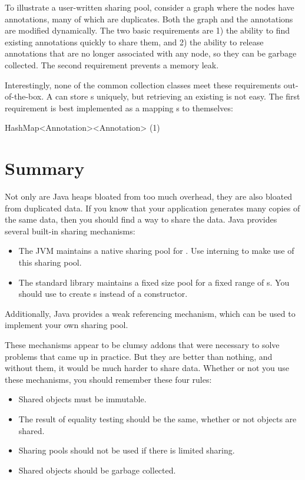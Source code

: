 To illustrate a user-written sharing pool, consider a graph where the nodes
have annotations, many of which are duplicates. Both the graph and the
annotations are modified dynamically. The two basic requirements are 1) the
ability to find existing annotations quickly to share them, and 2) the ability
to release annotations that are no longer associated with any node, so they can
be garbage collected.  The second requirement prevents a memory leak. 

Interestingly, none of the common collection classes meet these
requirements out-of-the-box. A  can store
s uniquely, but retrieving an existing  is not easy. 
The first requirement is best implemented as a  mapping
s to themselves:
\begin{shortlisting}
 	HashMap<Annotation><Annotation>   (1)
\end{shortlisting}


\section{Summary} 

Not only are Java heaps bloated from too much overhead, they
are also bloated from duplicated data. If you know that your application
generates many copies of the same data, then you should find a way to share the
data. Java provides several built-in sharing mechanisms:

\begin{itemize}
  \item The JVM maintains a native sharing
  pool for . Use  interning to make use of this
  sharing pool.
  \item The standard library maintains a fixed size pool for
   a fixed range of  s. You should use  to create
   s instead of a constructor.
\end{itemize}
Additionally, Java provides a weak referencing mechanism, which can be used to
implement your own sharing pool.

These mechanisms appear to be clumsy addons that were necessary to solve
problems that came up in practice. But they are better than nothing, and
without them, it would be much harder to share data. 
Whether or not you use these mechanisms, you should remember these four rules:
\begin{itemize}
  \item Shared objects must be immutable.
  \item The result of equality testing should be the same, whether or
not objects are shared.  
  \item Sharing pools should not be used if there is limited sharing.
  \item Shared objects should be garbage collected.
\end{itemize}





